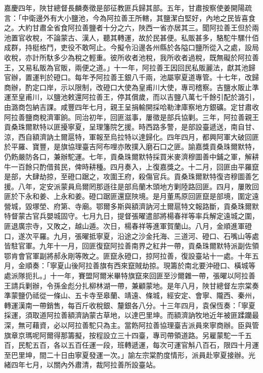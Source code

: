 \begin{pinyinscope}
嘉慶四年，陜甘總督長麟奏徵是部征教匪兵歸其部。五年，甘肅按察使姜開陽疏言：「中衛邊外有大小鹽池，今為阿拉善王所轄，其鹽潔白堅好，內地之民皆喜食之。大約甘肅全省食阿拉善鹽者十分之六，陜西一省亦居其三。聞阿拉善王但於兩池置官收稅，不論蒙古、漢人，聽其轉運，故於民甚便。私販甚多，駱駝牛騾什佰成群，持梃格鬥，吏役不敢呵止。今擬令沿邊各州縣於各隘口鹽所從入之處，設局收稅，亦計所馱多少為稅之輕重。彼所收者池稅，我所收者過稅，既無礙於阿拉善王，又易私販為官販，兩便之道。」十一年，阿拉善王因回民私販麗法，獻其池歸官辦，置運判於磴口。每年予阿拉善王銀八千兩，池屬寧夏道專管。十七年，改歸商辦，酌定口岸，示以限制，改磴口大使為皇甫川大使，專司稽察。吉鹽水販止準運至皇甫川，以鹽池敕還阿拉善王，停其償歲，而以吉鹽八萬七千餘引配於潞引，由潞商包納吉課。咸豐四年七月，親王呈捐輸開採哈勒津庫察地方銀礦。定甘肅收阿拉善鹽商稅濟軍餉。同治初年，回匪滋事，屢徵是部兵協剿。三年，阿拉善親王貢桑珠爾默特以匪擾寧夏，呈理籓院乞援。時西路多警，是部設臺遞送，南自甘、涼，西自額濟訥土爾扈特，軍報至烏拉特以達歸化。四年四月，都興阿軍大破回匪於平羅、寶豐，是旗協理臺吉阿布哩亦敗撲入磨石口之匪。諭嘉獎貢桑珠爾默特，仍飭嚴防各口，兼辦駝運。七年，貢桑珠爾默特採買米麥濟穆圖善中鋪之軍，解耕牛一百餘只酌借貧民，俾時耕種。四月奏入，上復嘉獎之。十二月，回匪由平羅竄是部，大肆劫掠，至磴口踞之，攻圍王府，殺傷官兵。貢桑珠爾默特復咨穆圖善乞援。八年，定安派蒙員烏爾罔那遜往是部烏蘭木頭地方剿陸路回匪。四月，屢敗回匪於下永和姜、上永和姜。磴口踞匪還竄陜境。是月董馬原回匪竄是部境，圍定遠營城，毀塚塋、府第、寺廟。鄂爾多斯與額濟訥河土爾扈特文報路斷，貢桑珠爾默特督蒙古官兵嬰城固守。七月九日，提督張曜遣部將楊春祥等率兵解定遠城之圍，匪退廣宗寺，又敗之，越山遁。次日，楊春祥等進軍賀蘭山。八月，金順進軍磴口，遂次平羅。九月，張曜抵寧夏，沿途之沙金托海、三道河、磴口、石嘴山等處皆駐官軍。九年十一月，回匪復竄阿拉善南界之紅井一帶，貢桑珠爾默特派副佐領鄂肯會官軍副將郝永剛等敗之。匪竄永磴口，掠阿拉善，復設臺站十一處。十年五月，金順奏：「寧夏山後阿拉善旗有西來竄賊劫掠。現籌於南北要沖磴口、橫城等處派隊扼扎。」十一年，賽盟阿爾米畢特旗竄來回匪至沙爾雜一帶，張曜以阿拉善王請兵剿辦，令孫金彪分扎柳林湖一帶，兼顧蒙地。是年八月，陜甘總督左宗棠奏準蒙鹽仍祗從一條山、五卡寺至皋蘭、靖遠、條城，經安定、會寧、隴西、秦州，轉運漢南一帶銷售，每百斤收稅銀、釐銀各八分。十三年四月，袁保恆奏：「寧夏採運，須取道阿拉善額濟訥蒙古草地，以達巴里坤。而額濟訥牧地近年被匪蹂躪最深，無可藉資，必以阿拉善駝只為主。當飭阿拉善協理臺吉派員來寧商辦。臣與管旗章京瑪呢阿爾得那籌擬，按程設立三十四臺，專司帶領道路。另雇蒙駝一千五百，民駝五百，各以五百任運一段，班轉遞運，每次可運官斛八百石，限四十月運至巴里坤，間二十日由寧夏發運一次。」諭左宗棠酌度情形，派員赴寧夏接辦。光緒四年七月，以關內外肅清，裁阿拉善所設臺站。


\end{pinyinscope}
